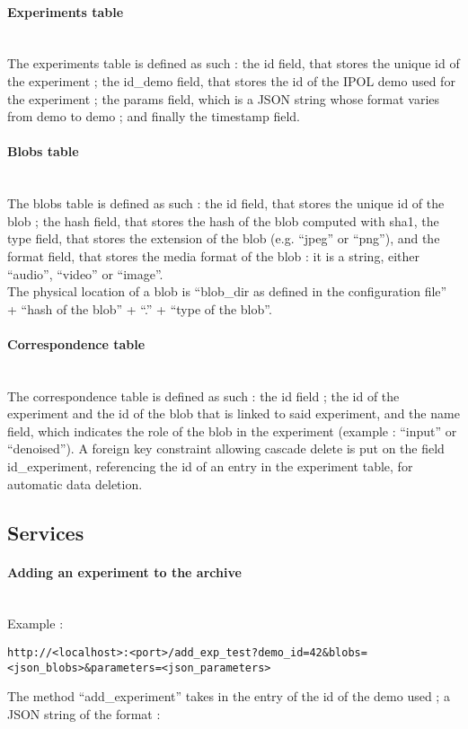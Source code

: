 \paragraph{Experiments table} \hspace{0pt} \\
The experiments table is defined as such : the id field, that stores the unique id of the experiment ; the id\_demo field, that stores the id of the IPOL demo used for the experiment ; the params field, which is a JSON string whose format varies from demo to demo ; and finally the timestamp field.

\paragraph{Blobs table} \hspace{0pt} \\
The blobs table is defined as such : the id field, that stores the unique id of the blob ; the hash field, that stores the hash of the blob computed with sha1, the type field, that stores the extension of the blob (e.g. ``jpeg'' or ``png''), and the format field, that stores the media format of the blob : it is a string, either ``audio'', ``video'' or ``image''. \\
The physical location of a blob is ``blob\_dir as defined in the configuration file'' + ``hash of the blob'' + ``.'' + ``type of the blob''.

\paragraph{Correspondence table} \hspace{0pt} \\
The correspondence table is defined as such : the id field ; the id of the experiment and the id of the blob that is linked to said experiment, and the name field, which indicates the role of the blob in the experiment (example : ``input'' or ``denoised''). A foreign key constraint allowing cascade delete is put on the field id\_experiment, referencing the id of an entry in the experiment table, for automatic data deletion.

\subsection{Services}

\paragraph{Adding an experiment to the archive} \hspace{0pt} \\
Example :
\begin{verbatim}
http://<localhost>:<port>/add_exp_test?demo_id=42&blobs=
<json_blobs>&parameters=<json_parameters>
\end{verbatim}
The method ``add\_experiment'' takes in the entry of the id of the demo used ; a JSON string of the format : 

